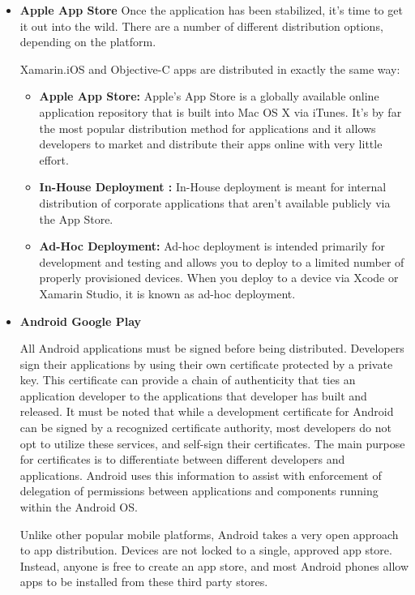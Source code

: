 \begin{itemize}
\item \textbf{Apple App Store}
Once the application has been stabilized, it’s time to get it out into the wild. There are a number of different distribution options, depending on the platform.

Xamarin.iOS and Objective-C apps are distributed in exactly the same way:

\begin{itemize}

\item \textbf{Apple App Store: } Apple’s App Store is a globally available online application repository that is built into Mac OS X via iTunes. It’s by far the most popular distribution method for applications and it allows developers to market and distribute their apps online with very little effort.
\item \textbf{In-House Deployment : } In-House deployment is meant for internal distribution of corporate applications that aren’t available publicly via the App Store.
\item \textbf{Ad-Hoc Deployment: }  Ad-hoc deployment is intended primarily for development and testing and allows you to deploy to a limited number of properly provisioned devices. When you deploy to a device via Xcode or Xamarin Studio, it is known as ad-hoc deployment.

\end{itemize}

\item \textbf{Android Google Play}

All Android applications must be signed before being distributed. Developers sign their applications by using their own certificate protected by a private key. This certificate can provide a chain of authenticity that ties an application developer to the applications that developer has built and released. It must be noted that while a development certificate for Android can be signed by a recognized certificate authority, most developers do not opt to utilize these services, and self-sign their certificates. The main purpose for certificates is to differentiate between different developers and applications. Android uses this information to assist with enforcement of delegation of permissions between applications and components running within the Android OS.

Unlike other popular mobile platforms, Android takes a very open approach to app distribution. Devices are not locked to a single, approved app store. Instead, anyone is free to create an app store, and most Android phones allow apps to be installed from these third party stores.


\end{itemize}
